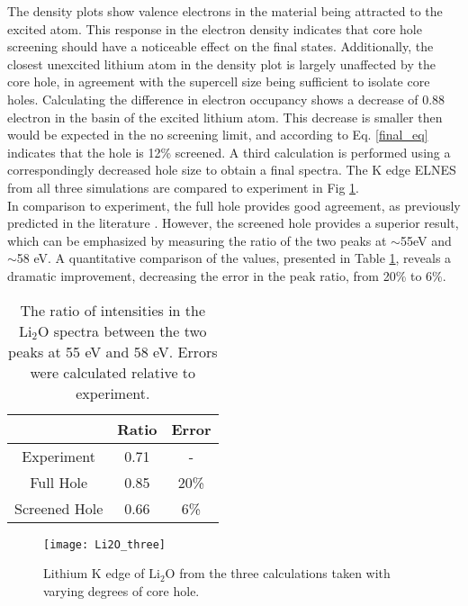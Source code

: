 The density plots show valence electrons in the material being attracted to the excited atom. This response in the electron density indicates that core hole screening should have a noticeable effect on the final states.  Additionally, the closest unexcited lithium atom in the density plot is largely unaffected by the core hole, in agreement with the supercell size being sufficient to isolate core holes.  Calculating the difference in electron occupancy shows a decrease of 0.88 electron in the basin of the excited lithium atom.  This decrease is smaller then would be expected in the no screening limit, and according to Eq. \ref{final_eq} indicates that the hole is 12\% screened.  A third calculation is performed using a correspondingly decreased hole size to obtain a final spectra.  The K edge ELNES from all three simulations are compared to experiment in Fig \ref{Li2O_three}.  \\

In comparison to experiment, the full hole provides good agreement, as previously predicted in the literature \cite{mauchamp_ab_2006}. However, the screened hole provides a superior result, which can be emphasized by measuring the ratio of the two peaks at $\sim$55eV and $\sim$58 eV.  A quantitative comparison of the values, presented in Table \ref{ratio}, reveals a dramatic improvement, decreasing the error in the peak ratio, from 20\% to  6\%.  

\begin{table}[H]
	\centering
		\caption{The ratio of intensities in the $\mathrm{Li_2O}$ spectra between the two peaks at 55 eV and 58 eV.  Errors were calculated relative to experiment.   }
	
	\begin{tabular}{ccc}
		& Ratio & Error \\
		\hline
		Experiment & 0.71 & -  \\
		Full Hole & 0.85 & 20\%  \\
		Screened Hole & 0.66 & 6\%  \\
		
	\end{tabular}
\label{ratio}
\end{table}




\begin{figure}
	\centering
	\texttt{[image: Li2O\_three]}
	\caption{Lithium K edge of $ \mathrm{Li_2O} $ from the three calculations taken with varying degrees of core hole. }
	\label{Li2O_three}
\end{figure}

